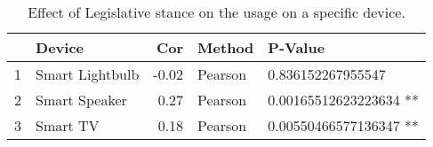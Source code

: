 \begin{table}[ht]
\centering
\begin{tabular}{rlrll}
  \hline
 & Device & Cor & Method & P-Value \\ 
  \hline
1 & Smart Lightbulb & -0.02 & Pearson & 0.836152267955547   \\ 
  2 & Smart Speaker & 0.27 & Pearson & 0.00165512623223634 ** \\ 
  3 & Smart TV & 0.18 & Pearson & 0.00550466577136347 ** \\ 
   \hline
\end{tabular}
\caption{Effect of Legislative stance on the usage on a specific device.} 
\label{RQ1_H2_UsageLA}
\end{table}
